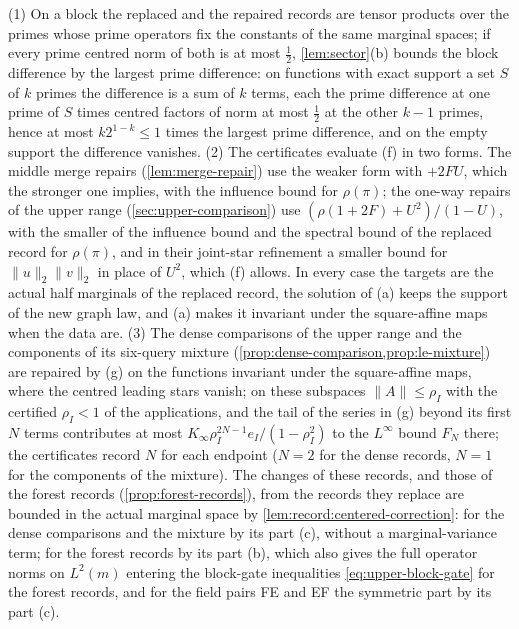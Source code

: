 \begin{remark}\label{rem:repair-forms}
(1) On a block the replaced and the repaired records are tensor products over
the primes whose prime operators fix the constants of the same marginal spaces;
if every prime centred norm of both is at most $\frac12$, \cref{lem:sector}(b)
bounds the block difference by the largest prime difference: on
functions with exact support a set $S$ of $k$ primes the difference is a
sum of $k$ terms, each the prime difference at one prime of $S$ times
centred factors of norm at most $\frac12$ at the other $k-1$ primes,
hence at most $k2^{1-k}\le1$ times the largest prime difference, and on
the empty support the difference vanishes. (2) The certificates evaluate (f) in two forms. The middle merge
repairs (\cref{lem:merge-repair}) use the weaker form with $+2FU$, which the
stronger one implies, with the influence bound for $\rho(\pi)$; the one-way
repairs of the upper range (\cref{sec:upper-comparison}) use
$(\rho(1+2F)+U^2)/(1-U)$, with the smaller of the influence bound and the
spectral bound of the replaced record for $\rho(\pi)$, and in their joint-star
refinement a smaller bound for $\|u\|_2\|v\|_2$ in place of $U^2$, which (f)
allows. In every case the targets are the actual half marginals of the replaced
record, the solution of (a) keeps the support of the new graph law, and (a)
makes it invariant under the square-affine maps when the data are. (3) The
dense comparisons of the upper range and the components of its six-query
mixture (\cref{prop:dense-comparison,prop:le-mixture}) are repaired by (g) on
the functions invariant under the square-affine maps, where the centred
leading stars vanish; on these subspaces $\|A\|\le\rho_I$ with the
certified $\rho_I<1$ of the applications, and the tail of the series in
(g) beyond its first $N$ terms contributes at most
$K_\infty\rho_I^{2N-1}e_I/(1-\rho_I^2)$ to the $L^\infty$ bound $F_N$
there; the certificates record $N$ for each endpoint ($N=2$
for the dense records, $N=1$ for the components of the mixture). The changes
of these records, and those of the forest records (\cref{prop:forest-records}),
from the records they replace are bounded in the actual marginal space by
\cref{lem:record:centered-correction}: for the dense comparisons and the
mixture by its part (c), without a marginal-variance term; for the forest
records by its part (b), which also gives the full operator norms on
$L^2(m)$ entering the block-gate inequalities \eqref{eq:upper-block-gate}
for the forest records,
and for the field pairs FE and EF the symmetric part by its part (c).
\end{remark}

